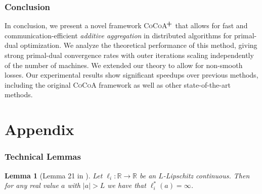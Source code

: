 \documentclass{article}
\newcommand{\cocoa}{\textsc{CoCoA}\xspace}
\newcommand{\cocoap}{\textsc{CoCoA$\!^{\bf \textbf{\footnotesize+}}$}\xspace}
\newcommand{\R}{\mathbb{R}}                      %
\newcommand{\0}{ {\bf 0}}
\theoremstyle{plain}
\newtheorem{lemma}[theorem]{Lemma}
\theoremstyle{definition}
\begin{document}
{%
\section{Conclusion}
In conclusion, we present a novel framework \cocoap that allows for fast and  
communication-efficient \textit{additive aggregation} in distributed 
algorithms for primal-dual optimization. 
We analyze the theoretical performance of this method, giving strong 
primal-dual convergence rates with outer iterations scaling independently of 
the number of machines. 
We extended our theory to allow for non-smooth losses. Our 
experimental results show significant speedups over previous methods, including the 
original \cocoa framework as well as other state-of-the-art methods.

} %




 


\clearpage
\appendix
 \onecolumn
\part{Appendix}


\section{Technical Lemmas}


\begin{lemma}
[Lemma 21 in \cite{ShalevShwartz:2013wl}]
\label{lemma:ajvoiewffa}
Let $\ell_i : \R \to \R$ be an 
$L$-Lipschitz continuous. Then for any real value $a$ with $|a|> L$ we have that
$\ell_i^*(a) = \infty$.
\end{lemma}
\end{document}
